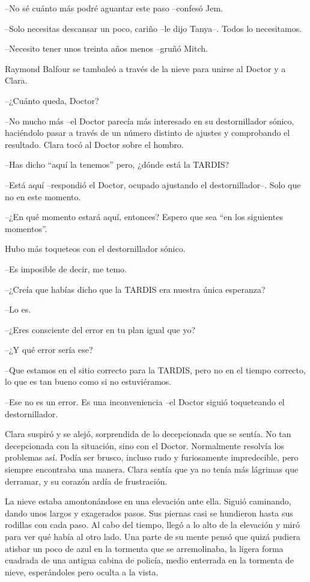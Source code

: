 {--No sé cuánto más podré aguantar este paso --confesó Jem.}

{--Solo necesitas descansar un poco, cariño --le dijo Tanya--. Todos lo
necesitamos.}

{--Necesito tener unos treinta años menos --gruñó Mitch.}

{Raymond Balfour se tambaleó a través de la nieve para unirse al Doctor y
a Clara.}

{--¿Cuánto queda, Doctor?}

{--No mucho más --el Doctor parecía más interesado en su destornillador
 sónico, haciéndolo pasar a través de un número distinto de ajustes y
comprobando el resultado. Clara tocó al Doctor sobre el hombro.}

{--Has dicho ``aquí la tenemos'' pero, ¿dónde está la TARDIS?}

{--Está aquí --respondió el Doctor, ocupado ajustando el
destornillador--. Solo que no en este momento.}

{--¿En qué momento estará aquí, entonces? Espero que sea ``en los
siguientes momentos''.}

{Hubo más toqueteos con el destornillador sónico.}

{--Es imposible de decir, me temo.}

{--¿Creía que habías dicho que la TARDIS era nuestra única esperanza?}

{--Lo es.}

{--¿Eres consciente del error en tu plan igual que yo?}

{--¿Y qué error sería ese?}

{--Que estamos en el sitio correcto para la TARDIS, pero no en el tiempo
correcto, lo que es tan bueno como si no estuviéramos.}

{--Ese no es un error. Es una inconveniencia --el Doctor siguió
toqueteando el destornillador.}

{Clara suspiró y se alejó, sorprendida de lo decepcionada que se sentía.
 No tan decepcionada con la situación, sino con el Doctor. Normalmente
 resolvía los problemas así. Podía ser brusco, incluso rudo y
 furiosamente impredecible, pero siempre encontraba una manera. Clara
 sentía que ya no tenía más lágrimas que derramar, y su corazón ardía de
frustración.}

{La nieve estaba amontonándose en una elevación ante ella. Siguió
 caminando, dando unos largos y exagerados pasos. Sus piernas casi se
 hundieron hasta sus rodillas con cada paso. Al cabo del tiempo, llegó a
 lo alto de la elevación y miró para ver qué había al otro lado. Una
 parte de su mente pensó que quizá pudiera atisbar un poco de azul en la
 tormenta que se arremolinaba, la ligera forma cuadrada de una antigua
 cabina de policía, medio enterrada en la tormenta de nieve, esperándoles
pero oculta a la vista.}

